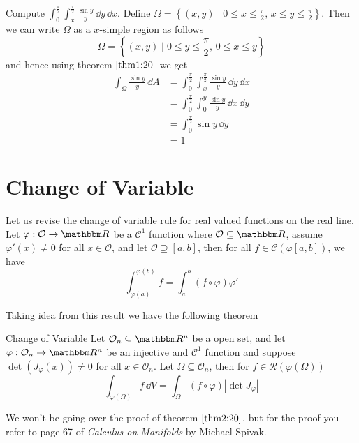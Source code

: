 \documentclass[Analysis-3]{subfiles}
\begin{document}
\begin{Eg}{}{}
    Compute $\displaystyle{ \int_0^{\frac{\pi}{2}} \int_x^{\frac{\pi}{2}}} \frac{\sin y}{y} \, \dd y \, \dd x$. Define $\Omega = \left\{ (x,y) \mid 0 \leq x \leq \frac{\pi}{2}, \, x \leq y \leq \frac{\pi}{2} \right\}$. Then we can write $\Omega$ as a $x$-simple region as follows
    \[
        \Omega = \left\{ (x,y) \mid 0 \leq y \leq \frac{\pi}{2}, \, 0 \leq x \leq y \right\}    
    \]
    and hence using theorem $\ref{thm1:20}$ we get 
    \begin{align*}
        \int_{\Omega} \frac{\sin y}{y} \, \dd A &= \int_{0}^{\frac{\pi}{2}} \int_x^{\frac{\pi}{2}} \frac{\sin y}{y} \, \dd y \, \dd x \\ 
        &= \int_0^{\frac{\pi}{2}} \int_0^y \frac{\sin y}{y} \, \dd x \, \dd y \\ 
        &= \int_0^{\frac{\pi}{2}} \sin y \, \dd y \\ 
        &= 1
    \end{align*}
\end{Eg}

\section{Change of Variable}

Let us revise the change of variable rule for real valued functions on the real line. Let $\varphi : \mathcal{O} \to \R$ be a $\mathscr{C}^1$ function where $\mathcal{O} \subseteq \R$, assume $\varphi'(x) \neq 0$ for all $x \in \mathcal{O}$, and let $\mathcal{O} \supseteq [a,b]$, then for all $f \in \mathscr{C}(\varphi[a,b])$, we have 
\[
    \int_{\varphi(a)}^{\varphi(b)} f = \int_a^b (f \circ \varphi) \varphi'     
\]

Taking idea from this result we have the following theorem 

\begin{Thm}{Change of Variable}{}\label{thm2:20}
    Let $\mathcal{O}_n \subseteq \R^n$ be a open set, and let $\varphi : \mathcal{O}_n \to \R^n$ be an injective and $\mathscr{C}^1$ function and suppose $\det(J_{\varphi}(x)) \neq 0$ for all $x \in \mathcal{O}_n$. Let $\Omega \subseteq \mathcal{O}_n$, then for $f \in \mathscr{R}(\varphi(\Omega))$ 
    \[
        \int_{\varphi(\Omega)} f \, \dd V = \int_{\Omega} (f \circ \varphi) |\det J_{\varphi}|     
    \]
\end{Thm}
We won't be going over the proof of theorem $\ref{thm2:20}$, but for the proof you refer to page 67 of \textit{Calculus on Manifolds} by Michael Spivak.
\end{document}
